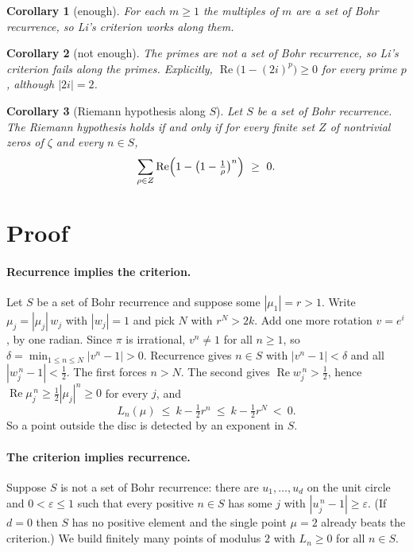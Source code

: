 \documentclass[11pt,a4paper]{article}
\newtheorem{corollary}{Corollary}
\theoremstyle{definition}\newtheorem*{definition}{Definition}
\theoremstyle{remark}\newtheorem*{remark}{Remark}
\newcommand{\re}{\operatorname{Re}}
\begin{document}
\begin{corollary}[enough]
For each $m\ge1$ the multiples of $m$ are a set of Bohr recurrence, so Li's criterion works along
them.
\end{corollary}

\begin{corollary}[not enough]
The primes are not a set of Bohr recurrence, so Li's criterion fails along the primes. Explicitly,
$\re\bigl(1-(2i)^p\bigr)\ge 0$ for every prime $p$, although $|2i|=2$.
\end{corollary}

\begin{corollary}[Riemann hypothesis along $S$]
Let $S$ be a set of Bohr recurrence. The Riemann hypothesis holds if and only if for every finite
set $Z$ of nontrivial zeros of $\zeta$ and every $n\in S$,
\[ \sum_{\rho\in Z}\re\Bigl(1-\bigl(1-\tfrac1\rho\bigr)^{n}\Bigr)\ \ge\ 0 . \]
\end{corollary}

\section{Proof}

\paragraph{Recurrence implies the criterion.}
Let $S$ be a set of Bohr recurrence and suppose some $|\mu_1|=r>1$. Write $\mu_j=|\mu_j|\,w_j$
with $|w_j|=1$ and pick $N$ with $r^N>2k$. Add one more rotation $v=e^{i}$, by one radian. Since
$\pi$ is irrational, $v^n\ne1$ for all $n\ge1$, so $\delta=\min_{1\le n\le N}|v^n-1|>0$. Recurrence
gives $n\in S$ with $|v^n-1|<\delta$ and all $|w_j^{\,n}-1|<\tfrac12$. The first forces $n>N$. The
second gives $\re w_j^{\,n}>\tfrac12$, hence $\re\mu_j^{\,n}\ge\tfrac12|\mu_j|^n\ge0$ for every
$j$, and
\[ L_n(\mu)\ \le\ k-\tfrac12 r^{n}\ \le\ k-\tfrac12 r^{N}\ <\ 0 . \]
So a point outside the disc is detected by an exponent in $S$.

\paragraph{The criterion implies recurrence.}
Suppose $S$ is not a set of Bohr recurrence: there are $u_1,\dots,u_d$ on the unit circle and
$0<\varepsilon\le1$ such that every positive $n\in S$ has some $j$ with
$|u_j^{\,n}-1|\ge\varepsilon$. (If $d=0$ then $S$ has no positive element and the single point
$\mu=2$ already beats the criterion.) We build finitely many points of modulus $2$ with
$L_n\ge0$ for all $n\in S$.
\end{document}
